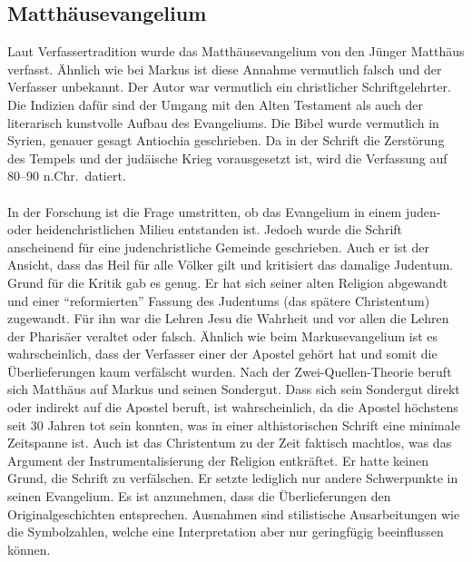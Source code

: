 \subsection*{Matthäusevangelium}
Laut Verfassertradition wurde das Matthäusevangelium von den Jünger Matthäus verfasst. Ähnlich wie bei Markus ist diese Annahme vermutlich falsch und der Verfasser unbekannt. Der Autor war vermutlich ein christlicher Schriftgelehrter. Die Indizien dafür sind der Umgang mit den Alten Testament als auch der literarisch kunstvolle Aufbau des Evangeliums. Die Bibel wurde vermutlich in Syrien, genauer gesagt Antiochia geschrieben. Da in der Schrift die Zerstörung des Tempels und der judäische Krieg vorausgesetzt ist, wird die Verfassung auf 80--90 n.Chr.\ datiert.
\\~\\
In der Forschung ist die Frage umstritten, ob das Evangelium in einem juden- oder heidenchristlichen Milieu entstanden ist. Jedoch wurde die Schrift anscheinend für eine judenchristliche Gemeinde geschrieben. Auch er ist der Ansicht, dass das Heil für alle Völker gilt und kritisiert das damalige Judentum. Grund für die Kritik gab es genug. Er hat sich seiner alten Religion abgewandt und einer ``reformierten'' Fassung des Judentums (das spätere Christentum) zugewandt. Für ihn war die Lehren Jesu die Wahrheit und vor allen die Lehren der Pharisäer veraltet oder falsch. Ähnlich wie beim Markusevangelium ist es wahrscheinlich, dass der Verfasser einer der Apostel gehört hat und somit die Überlieferungen kaum verfälscht wurden. Nach der Zwei-Quellen-Theorie beruft sich Matthäus auf Markus und seinen Sondergut. Dass sich sein Sondergut direkt oder indirekt auf die Apostel beruft, ist wahrscheinlich, da die Apostel höchstens seit 30 Jahren tot sein konnten, was in einer althistorischen Schrift eine minimale Zeitspanne ist.  Auch ist das Christentum zu der Zeit faktisch machtlos, was das Argument der Instrumentalisierung der Religion entkräftet. Er hatte keinen Grund, die Schrift zu verfälschen. Er setzte lediglich nur andere Schwerpunkte in seinen Evangelium. Es ist anzunehmen, dass die Überlieferungen den Originalgeschichten entsprechen. Ausnahmen sind stilistische Ausarbeitungen wie die Symbolzahlen, welche eine Interpretation aber nur geringfügig beeinflussen können.

